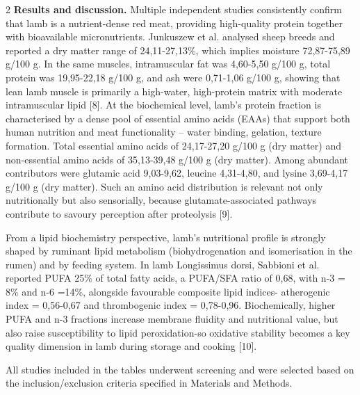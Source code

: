 \begin{multicols}{2}
{\bfseries Results and discussion.} Multiple independent studies
consistently confirm that lamb is a nutrient-dense red meat, providing
high-quality protein together with bioavailable micronutrients.
Junkuszew et al. analysed sheep breeds and reported a dry matter range
of 24,11-27,13\%, which implies moisture 72,87-75,89 g/100 g. In the
same muscles, intramuscular fat was 4,60-5,50 g/100 g, total protein was
19,95-22,18 g/100 g, and ash were 0,71-1,06 g/100 g, showing that lean
lamb muscle is primarily a high-water, high-protein matrix with moderate
intramuscular lipid {[}8{]}. At the biochemical level, lamb's protein
fraction is characterised by a dense pool of essential amino acids
(EAAs) that support both human nutrition and meat functionality -- water
binding, gelation, texture formation. Total essential amino acids of
24,17-27,20 g/100 g (dry matter) and non-essential amino acids of
35,13-39,48 g/100 g (dry matter). Among abundant contributors were
glutamic acid 9,03-9,62, leucine 4,31-4,80, and lysine 3,69-4,17 g/100 g
(dry matter). Such an amino acid distribution is relevant not only
nutritionally but also sensorially, because glutamate-associated
pathways contribute to savoury perception after proteolysis {[}9{]}.

From a lipid biochemistry perspective, lamb's nutritional profile is
strongly shaped by ruminant lipid metabolism (biohydrogenation and
isomerisation in the rumen) and by feeding system. In lamb Longissimus
dorsi, Sabbioni et al. reported PUFA 25\% of total fatty acids, a
PUFA/SFA ratio of 0,68, with n-3 = 8\% and n-6 =14\%, alongside
favourable composite lipid indices- atherogenic index = 0,56-0,67 and
thrombogenic index = 0,78-0,96. Biochemically, higher PUFA and n-3
fractions increase membrane fluidity and nutritional value, but also
raise susceptibility to lipid peroxidation-so oxidative stability
becomes a key quality dimension in lamb during storage and cooking
{[}10{]}.

All studies included in the tables underwent screening and were selected
based on the inclusion/exclusion criteria specified in Materials and
Methods.
\end{multicols}

